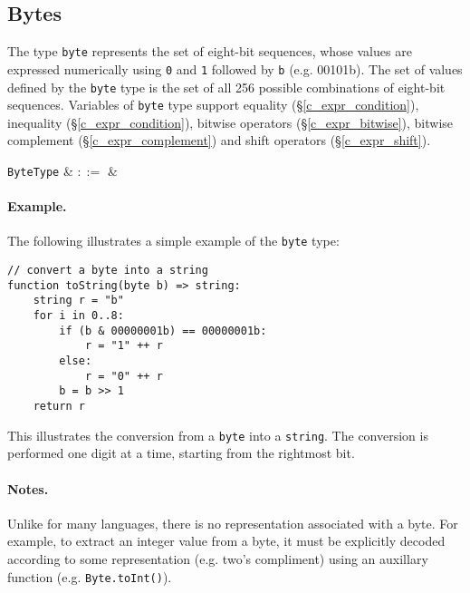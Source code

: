 \subsection{Bytes}
\label{c_types_byte}

The type \lstinline{byte} represents the set of eight-bit sequences, whose values are expressed numerically using \lstinline{0} and \lstinline{1} followed by \lstinline{b} (e.g. 00101b).  The set of values defined by the \lstinline{byte} type is the set of all 256 possible combinations of eight-bit sequences.   Variables of \lstinline{byte} type support equality (\S\ref{c_expr_condition}), inequality (\S\ref{c_expr_condition}), bitwise operators (\S\ref{c_expr_bitwise}), bitwise complement (\S\ref{c_expr_complement}) and shift operators (\S\ref{c_expr_shift}).

\begin{syntax}
 \verb+ByteType+ & $::=$ & \\
\end{syntax}

\paragraph{Example.} The following illustrates a simple example of the \lstinline{byte} type:

\begin{lstlisting}
// convert a byte into a string
function toString(byte b) => string:
    string r = "b"
    for i in 0..8:
        if (b & 00000001b) == 00000001b:
            r = "1" ++ r
        else:
            r = "0" ++ r
        b = b >> 1	
    return r
\end{lstlisting}
This illustrates the conversion from a \lstinline{byte} into a \lstinline{string}.  The conversion is performed one digit at a time, starting from the rightmost bit.

\paragraph{Notes.}  Unlike for many languages, there is no representation associated with a byte. For example, to extract an integer value from a byte, it must be explicitly decoded according to some representation (e.g. two's compliment) using an auxillary function (e.g. \lstinline{Byte.toInt()}).



